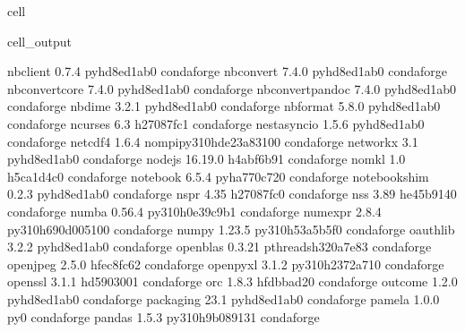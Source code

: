 \documentclass[letterpaper,table,10pt,english]{jupyterBook}
\begin{document}
\begin{sphinxuseclass}{cell}
\begin{sphinxVerbatimOutput}
\begin{sphinxuseclass}{cell_output}
\begin{sphinxVerbatim}[commandchars=\\\{\}]
nbclient                  0.7.4              pyhd8ed1ab\PYGZus{}0    conda\PYGZhy{}forge
nbconvert                 7.4.0              pyhd8ed1ab\PYGZus{}0    conda\PYGZhy{}forge
nbconvert\PYGZhy{}core            7.4.0              pyhd8ed1ab\PYGZus{}0    conda\PYGZhy{}forge
nbconvert\PYGZhy{}pandoc          7.4.0              pyhd8ed1ab\PYGZus{}0    conda\PYGZhy{}forge
nbdime                    3.2.1              pyhd8ed1ab\PYGZus{}0    conda\PYGZhy{}forge
nbformat                  5.8.0              pyhd8ed1ab\PYGZus{}0    conda\PYGZhy{}forge
ncurses                   6.3                  h27087fc\PYGZus{}1    conda\PYGZhy{}forge
nest\PYGZhy{}asyncio              1.5.6              pyhd8ed1ab\PYGZus{}0    conda\PYGZhy{}forge
netcdf4                   1.6.4           nompi\PYGZus{}py310hde23a83\PYGZus{}100    conda\PYGZhy{}forge
networkx                  3.1                pyhd8ed1ab\PYGZus{}0    conda\PYGZhy{}forge
nodejs                    16.19.0              h4abf6b9\PYGZus{}1    conda\PYGZhy{}forge
nomkl                     1.0                  h5ca1d4c\PYGZus{}0    conda\PYGZhy{}forge
notebook                  6.5.4              pyha770c72\PYGZus{}0    conda\PYGZhy{}forge
notebook\PYGZhy{}shim             0.2.3              pyhd8ed1ab\PYGZus{}0    conda\PYGZhy{}forge
nspr                      4.35                 h27087fc\PYGZus{}0    conda\PYGZhy{}forge
nss                       3.89                 he45b914\PYGZus{}0    conda\PYGZhy{}forge
numba                     0.56.4          py310h0e39c9b\PYGZus{}1    conda\PYGZhy{}forge
numexpr                   2.8.4           py310h690d005\PYGZus{}100    conda\PYGZhy{}forge
numpy                     1.23.5          py310h53a5b5f\PYGZus{}0    conda\PYGZhy{}forge
oauthlib                  3.2.2              pyhd8ed1ab\PYGZus{}0    conda\PYGZhy{}forge
openblas                  0.3.21          pthreads\PYGZus{}h320a7e8\PYGZus{}3    conda\PYGZhy{}forge
openjpeg                  2.5.0                hfec8fc6\PYGZus{}2    conda\PYGZhy{}forge
openpyxl                  3.1.2           py310h2372a71\PYGZus{}0    conda\PYGZhy{}forge
openssl                   3.1.1                hd590300\PYGZus{}1    conda\PYGZhy{}forge
orc                       1.8.3                hfdbbad2\PYGZus{}0    conda\PYGZhy{}forge
outcome                   1.2.0              pyhd8ed1ab\PYGZus{}0    conda\PYGZhy{}forge
packaging                 23.1               pyhd8ed1ab\PYGZus{}0    conda\PYGZhy{}forge
pamela                    1.0.0                      py\PYGZus{}0    conda\PYGZhy{}forge
pandas                    1.5.3           py310h9b08913\PYGZus{}1    conda\PYGZhy{}forge

\end{sphinxVerbatim}
\end{sphinxuseclass}
\end{sphinxVerbatimOutput}
\end{sphinxuseclass}
\end{document}

